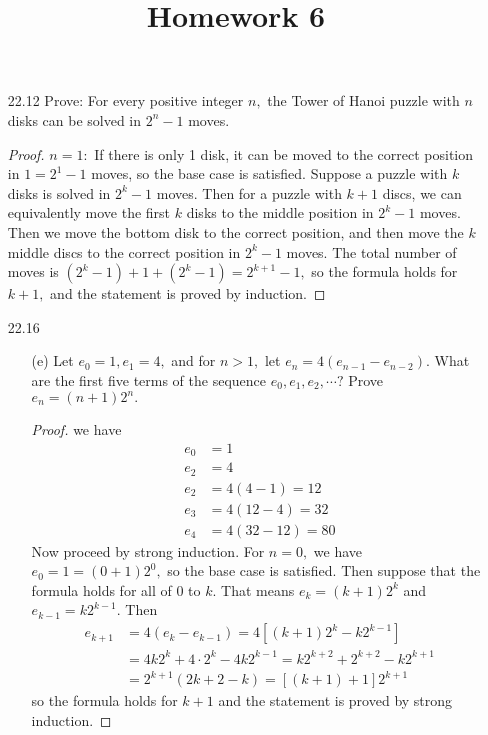 \documentclass{article}
\begin{document}
\title{Homework 6}
\maketitle
\thispagestyle{fancy}

\begin{itemize}
	\item[22.12] Prove: For every positive integer $n,$ the Tower of Hanoi puzzle with $n$ disks can be solved in $2^n-1$ moves.
		\begin{proof}
			$n=1:$ If there is only 1 disk, it can be moved to the correct position in $1=2^1-1$ moves, so the base case is satisfied. Suppose a puzzle with $k$ disks is solved in $2^k-1$ moves. Then for a puzzle with $k+1$ discs, we can equivalently move the first $k$ disks to the middle position in $2^k-1$ moves. Then we move the bottom disk to the correct position, and then move the $k$ middle discs to the correct position in $2^k-1$ moves. The total number of moves is $(2^k-1)+1+(2^k-1)=2^{k+1}-1,$ so the formula holds for $k+1,$ and the statement is proved by induction.
		\end{proof}

	\item[22.16]
		\begin{itemize}
			\item[(e)] Let $e_0=1, e_1=4,$ and for $n>1,$ let $e_n=4(e_{n-1}-e_{n-2}).$ What are the first five terms of the sequence $e_0, e_1, e_2, \cdots?$ Prove $e_n=(n+1)2^n.$
				\begin{proof}
					we have
					\begin{align*}
						e_0 &= 1 \\
						e_2 &= 4 \\
						e_2 &= 4(4-1)=12 \\
						e_3 &= 4(12-4)=32 \\
						e_4 &= 4(32-12)=80
					\end{align*}
					Now proceed by strong induction. For $n=0,$ we have $e_0=1=(0+1)2^0,$ so the base case is satisfied. Then suppose that the formula holds for all of 0 to $k.$ That means $e_k=(k+1)2^k$ and $e_{k-1}=k2^{k-1}.$ Then
					\begin{align*}
						e_{k+1} &= 4(e_k-e_{k-1}) = 4\left[ (k+1)2^k-k2^{k-1} \right] \\
						&= 4k2^k+4\cdot 2^k - 4k2^{k-1} = k2^{k+2}+2^{k+2}-k2^{k+1} \\
						&= 2^{k+1}(2k+2-k)=\left[ (k+1)+1 \right]2^{k+1}
					\end{align*}
					so the formula holds for $k+1$ and the statement is proved by strong induction.
				\end{proof}
				

\end{itemize}
\end{itemize}
\end{document}
